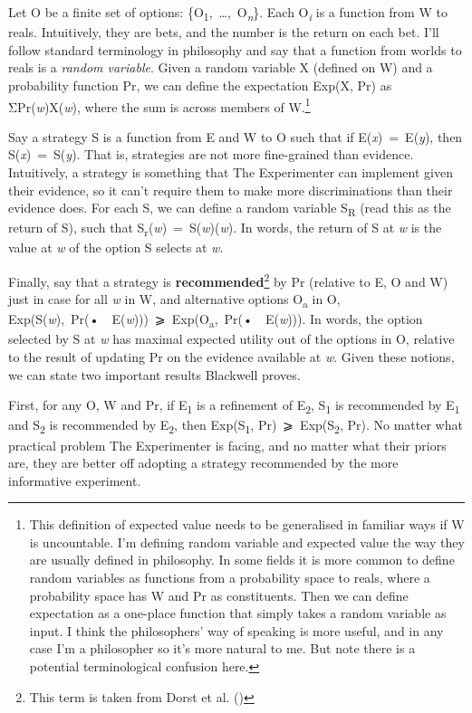 \documentclass[
  12pt,
  letterpaper,
  DIV=11,
  numbers=noendperiod]{scrartcl}
\begin{document}
Let O be a finite set of options:
\{O\textsubscript{1},~\ldots,~O\textsubscript{\emph{n}}\}. Each
O\textsubscript{\emph{i}} is a function from W to reals. Intuitively,
they are bets, and the number is the return on each bet. I'll follow
standard terminology in philosophy and say that a function from worlds
to reals is a \emph{random variable}. Given a random variable X (defined
on W) and a probability function Pr, we can define the expectation
Exp(X, Pr) as ΣPr(\emph{w})X(\emph{w}), where the sum is across members
of W.\footnote{This definition of expected value needs to be generalised
  in familiar ways if W is uncountable. I'm defining random variable and
  expected value the way they are usually defined in philosophy. In some
  fields it is more common to define random variables as functions from
  a probability space to reals, where a probability space has W and Pr
  as constituents. Then we can define expectation as a one-place
  function that simply takes a random variable as input. I think the
  philosophers' way of speaking is more useful, and in any case I'm a
  philosopher so it's more natural to me. But note there is a potential
  terminological confusion here.}

Say a strategy S is a function from E and W to O such that if
E(\emph{x})~=~E(\emph{y}), then S(\emph{x})~=~S(\emph{y}). That is,
strategies are not more fine-grained than evidence. Intuitively, a
strategy is something that The Experimenter can implement given their
evidence, so it can't require them to make more discriminations than
their evidence does. For each S, we can define a random variable
S\textsubscript{R} (read this as the return of S), such that
S\textsubscript{r}(\emph{w})~=~S(\emph{w})(\emph{w}). In words, the
return of S at \emph{w} is the value at \emph{w} of the option S selects
at \emph{w}.

Finally, say that a strategy is \textbf{recommended}\footnote{This term
  is taken from Dorst et al. ()} by Pr
(relative to E, O and W) just in case for all \emph{w} in W, and
alternative options O\textsubscript{a} in O,
Exp(S(\emph{w}),~Pr(•~\textbar~E(\emph{w})))~⩾~Exp(O\textsubscript{a},~Pr(•~\textbar~E(\emph{w}))).
In words, the option selected by S at \emph{w} has maximal expected
utility out of the options in O, relative to the result of updating Pr
on the evidence available at \emph{w}. Given these notions, we can state
two important results Blackwell proves.

First, for any O, W and Pr, if E\textsubscript{1} is a refinement of
E\textsubscript{2}, S\textsubscript{1} is recommended by
E\textsubscript{1} and S\textsubscript{2} is recommended by
E\textsubscript{2}, then Exp(S\textsubscript{1},
Pr)~⩾~Exp(S\textsubscript{2}, Pr). No matter what practical problem The
Experimenter is facing, and no matter what their priors are, they are
better off adopting a strategy recommended by the more informative
experiment.
\end{document}
